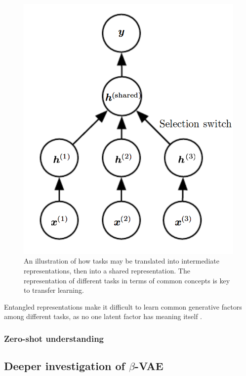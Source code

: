 \documentclass[12pt,twoside]{article}
\begin{document}
\begin{figure}
\includegraphics[scale=0.3]{figures/goodfellow_2015_15_2.png}
\centering
\captionsetup{justification=centering}
\caption{An illustration of how tasks may be translated into intermediate representations, then into a shared representation. The representation of different tasks in terms of common concepts is key to transfer learning. \cite{IanGoodfellowYoshuaBengio2015}}
\label{transfer_learning_graph_intuition}
\end{figure}

Entangled representations make it difficult to learn common generative factors among different tasks, as no one latent factor has meaning itself \cite{Whitney2016}.

\subsubsection{Zero-shot understanding}

\subsection{Deeper investigation of $\beta$-VAE}
\end{document}
